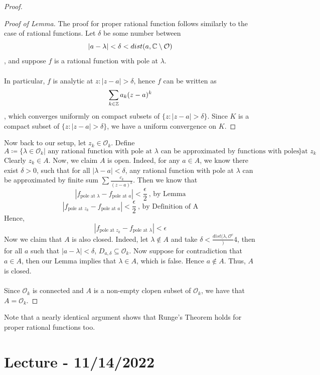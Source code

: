 \documentclass{article}
\begin{document}
\begin{proof}
\begin{proof}[Proof of Lemma]
    The proof for proper rational function follows similarly to the case of rational functions. Let $\delta$ be some number between
    \[|a - \lambda| < \delta < dist(a, \mathbb{C} \setminus \mathcal{O})\]
    , and suppose $f$ is a rational function with pole at $\lambda$.\\\\
    In particular, $f$ is analytic at $z: |z - a| > \delta$, hence $f$ can be written as
    \[\sum_{k \in \mathbb{Z}} a_k (z - a)^k\]
    , which converges uniformly on compact subsets of $\{z: |z - a| > \delta\}$. Since $K$ is a compact subset of $\{z: |z - a| > \delta\}$, we have a uniform convergence on $K$.
    \end{proof}
Now back to our setup, let $z_k \in \mathcal{O}_k$. Define
\[A \coloneqq \{\lambda \in \mathcal{O}_k | \text{ any rational function with pole at $\lambda$ can be approximated by functions with poles at $z_k$}\}\]
Clearly $z_k \in A$. Now, we claim $A$ is open. Indeed, for any $a \in A$, we know there exist $\delta > 0$, such that for all $|\lambda - a| < \delta$, any rational function with pole at $\lambda$ can be approximated by finite sum $\sum \frac{c_k}{(z - a)^k}$. Then we know that
\[|f_{\text{pole at $\lambda$}} - f_{\text{pole at $a$}}| < \frac{\epsilon}{2}\ \text{, by Lemma}\]
\[|f_{\text{pole at $z_k$}} - f_{\text{pole at $a$}}| < \frac{\epsilon}{2}\ \text{, by Definition of A}\]
Hence, 
\[|f_{\text{pole at $z_k$}} - f_{\text{pole at $\lambda$}}| < \epsilon\]
Now we claim that $A$ is also closed. Indeed, let $\lambda \notin A$ and take $\delta < \frac{dist(\lambda, \mathcal{O}^c}){4}$, then for all $a$ such that $|a - \lambda| < \delta$, $D_{a, \delta} \subseteq \mathcal{O}_k$. Now suppose for contradiction that $a \in A$, then our Lemma implies that $\lambda \in A$, which is false. Hence $a \notin A$. Thus, $A$ is closed.\\\\
Since $\mathcal{O}_k$ is connected and $A$ is a non-empty clopen subset of $\mathcal{O}_k$, we have that $A = \mathcal{O}_k$.
\end{proof}

\begin{remark}
    Note that a nearly identical argument shows that Runge's Theorem holds for proper rational functions too.
\end{remark}

\section{Lecture - 11/14/2022}
\end{document}
